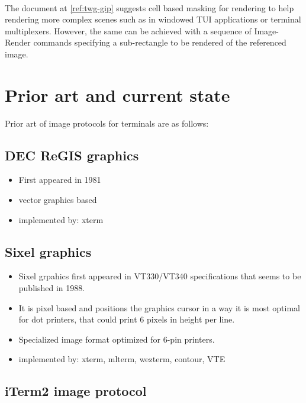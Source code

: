 \documentclass{article}
\begin{document}
\paragraph*{}

The document at \ref{ref:twg-gip} suggests cell based masking for rendering to help rendering more
complex scenes such as in windowed TUI applications or terminal multiplexers.
However, the same can be achieved with a sequence of Image-Render commands specifying a
sub-rectangle to be rendered of the referenced image.

\section{Prior art and current state} %

Prior art of image protocols for terminals are as follows:

\subsection{DEC ReGIS graphics}

\begin{itemize}
    \item First appeared in 1981
    \item vector graphics based
    \item implemented by: xterm
\end{itemize}

\subsection{Sixel graphics}

\begin{itemize}
    \item Sixel grpahics first appeared in VT330/VT340 specifications that seems to be published in 1988.
    \item It is pixel based and positions the graphics cursor in a way it is most optimal for dot printers,
        that could print 6 pixels in height per line.
    \item Specialized image format optimized for 6-pin printers.
    \item implemented by: xterm, mlterm, wezterm, contour, VTE
\end{itemize}

\subsection{iTerm2 image protocol}
\end{document}
